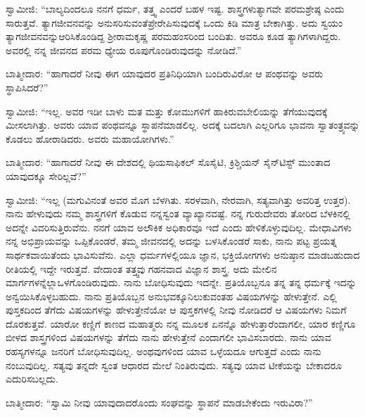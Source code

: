 \vskip 3pt

ಸ್ವಾಮೀಜಿ: “ಬಾಲ್ಯದಿಂದಲೂ ನನಗೆ ಧರ್ಮ, ತತ್ತ್ವ ಎಂದರೆ ಬಹಳ ಇಷ್ಟ. ಶಾಸ್ತ್ರಗಳು\break ತ್ಯಾಗವೇ ಪರಮಶ್ರೇಷ್ಠ ಎಂದು ಸಾರುತ್ತವೆ. ತ್ಯಾಗಜೀವನವನ್ನು ಅನುಸರಿಸುವಂತೆ\break ಪ್ರೇರೇಪಿಸುವುದಕ್ಕೆ ಒಂದು ಕಿಡಿ ಮಾತ್ರ ಬೇಕಾಗಿತ್ತು. ಅದು ಸ್ವಯಂ ತ್ಯಾಗಜೀವನವನ್ನು\break ಆರಿಸಿಕೊಂಡಿದ್ದ ಶ‍್ರೀರಾಮಕೃಷ್ಣ ಪರಮಹಂಸರಿಂದ ಬಂದಿತು. ಅವರೂ ಕೂಡ ತ್ಯಾಗಿಗಳಾಗಿದ್ದರು. ಅವರಲ್ಲಿ ನನ್ನ ಜೀವನದ ಪರಮ ಧ್ಯೇಯ ರೂಪುಗೊಂಡಿರುವುದನ್ನು ನೋಡಿದೆ.”

\vskip 3pt

ಬಾತ್ಮೀದಾರ: “ಹಾಗಾದರೆ ನೀವು ಈಗ ಯಾವುದರ ಪ್ರತಿನಿಧಿಯಾಗಿ ಬಂದಿರುವಿರೋ ಆ ಪಂಥವನ್ನು ಅವರು ಸ್ಥಾಪಿಸಿದರೆ?”

\vskip 3pt

ಸ್ವಾಮೀಜಿ: “ಇಲ್ಲ. ಅವರ ಇಡೀ ಬಾಳು ಮತ ಮತ್ತು ಕೋಮುಗಳಿಗೆ ಹಾಕಿರುವ\break ಬೇಲಿಯನ್ನು ತೆಗೆಯುವುದಕ್ಕೆ ಮೀಸಲಾಗಿತ್ತು. ಅವರು ಯಾವ ಪಂಥವನ್ನೂ ಸ್ಥಾಪನೆ\break ಮಾಡಲಿಲ್ಲ. ಅದಕ್ಕೆ ಬದಲಾಗಿ ಎಲ್ಲರಿಗೂ ಭಾವನಾ ಸ್ವಾತಂತ್ರ್ಯವನ್ನು ಕೊಡಲು ಹೋರಾಡಿದರು. ಅವರು ಮಹಾಯೋಗಿಗಳು.”

\vskip 3pt

ಬಾತ್ಮೀದಾರ: “ಹಾಗಾದರೆ ನೀವು ಈ ದೇಶದಲ್ಲಿ ಥಿಯಸಾಫಿಕಲ್​ ಸೊಸೈಟಿ, ಕ್ರಿಶ್ಚಿಯನ್​ ಸೈನ್​ಟಿಸ್ಟ್​ ಮುಂತಾದ ಯಾವುದಕ್ಕೂ ಸೇರಿಲ್ಲವೆ?”

\vskip 3pt

ಸ್ವಾಮೀಜಿ: “ಇಲ್ಲ (ಮಗುವಿನಂತೆ ಅವರ ಮೊಗ ಬೆಳಗಿತು. ಸರಳವಾಗಿ, ನೇರವಾಗಿ, ಸತ್ಯವಾಗಿತ್ತು ಅವರಿತ್ತ ಉತ್ತರ). ನಾನು ಹೇಳುವುದು ನಮ್ಮ ಶಾಸ್ತ್ರಗಳಿಗೆ ಕೊಡುವ ನನ್ನ\break ಸ್ವಂತ ವ್ಯಾಖ್ಯಾನವಷ್ಟೆ. ನನ್ನ ಗುರುದೇವರು ತೋರಿದ ಬೆಳಕಿನಲ್ಲಿ ಅದನ್ನೇ ವಿವರಿಸುತ್ತಿರುವೆನು. ನನಗೆ ಯಾವ ಅಲೌಕಿಕ ಅಧಿಕಾರವೂ ಇದೆ ಎಂದು ಹೇಳಿಕೊಳ್ಳುವುದಿಲ್ಲ. ಮೇಧಾವಿಗಳು ನನ್ನ ಅಭಿಪ್ರಾಯವನ್ನು ಒಪ್ಪಿಕೊಂಡರೆ, ತಮ್ಮ ಜೀವನದಲ್ಲಿ ಅದನ್ನು ಬಳಸಿಕೊಂಡರೆ ಸಾಕು, ನಾನು ಪಟ್ಟ ಪ್ರಯತ್ನ ಸಾರ್ಥಕವಾಯಿತೆಂದು ಭಾವಿಸುವೆನು. ಎಲ್ಲಾ ಧರ್ಮಗಳಲ್ಲಿಯೂ ಜ್ಞಾನ, ಭಕ್ತಿಯೋಗಗಳು ಅನುಷ್ಠಾನ ಮಾಡಬಹುದಾದ ರೀತಿಯಲ್ಲಿ ಇದ್ದೇ ಇರುತ್ತವೆ. ವೇದಾಂತ ತತ್ತ್ವವು ಗಹನವಾದ ವಿಜ್ಞಾನ ಶಾಸ್ತ್ರ. ಅದು ಮೇಲಿನ ಮಾರ್ಗಗಳನ್ನೆಲ್ಲಾ\break ಒಳಗೊಂಡಿರುವುದು. ನಾನು ಬೋಧಿಸುವುದು ಇದನ್ನೇ. ಪ್ರತಿಯೊಬ್ಬನೂ ತನ್ನ ತನ್ನ ಧರ್ಮಕ್ಕೆ ಇದನ್ನು ಅನ್ವಯಿಸಿಕೊಳ್ಳಬಹುದು. ನಾನು ಪ್ರತಿಯೊಬ್ಬನ ಅನುಭವಕ್ಕೂ\break ನಿಲುಕುವಂತಹ ವಿಷಯಗಳನ್ನು ಹೇಳುತ್ತೇನೆ. ಎಲ್ಲಿ ಪುಸ್ತಕದಿಂದ ತೆಗೆದು ವಿಷಯಗಳನ್ನು ಹೇಳುತ್ತೇನೆಯೋ ಆ ಪುಸ್ತಕಗಳಲ್ಲಿ ನೀವು ನೋಡಿದರೆ ಆ ವಿಷಯಗಳು ನಿಮಗೆ ದೊರಕುತ್ತವೆ. ಯಾರೋ ಕಣ್ಣಿಗೆ ಕಾಣದ ಮಹಾತ್ಮರು ನನ್ನ ಮೂಲಕ ಏನನ್ನೊ ಹೇಳುತ್ತಾರೆಂದಾಗಲೀ, ಯಾರ ಕಣ್ಣಿಗೂ ಬೀಳದ ಶಾಸ್ತ್ರಗಳಿಂದ ವಿಷಯಗಳನ್ನು ತೆಗೆದು ನಾನು ಹೇಳುತ್ತೇನೆ ಎಂದಾಗಲೀ ಭಾವಿಸಬಾರದು. ನಾನು ಯಾವ ರಹಸ್ಯಗಳನ್ನೂ ಜನರಿಗೆ ಬೋಧಿಸುವುದಿಲ್ಲ. ಅಂಥವುಗಳಿಂದ ಯಾವ ಒಳ್ಳೆಯದೂ ಆಗುತ್ತದೆ ಎಂದು ನಾನು ನಂಬುವುದಿಲ್ಲ. ಸತ್ಯವು ತನ್ನದೇ ಸ್ವಂತ ಆಧಾರದ ಮೇಲೆ ನಿಂತಿರುವುದು. ಸತ್ಯವು ಯಾವ ಟೀಕೆಯನ್ನು ಬೇಕಾದರೂ ಎದುರಿಸಬಲ್ಲದು.

\vskip 3pt

ಬಾತ್ಮೀದಾರ: “ಸ್ವಾಮಿ ನೀವು ಯಾವುದಾದರೊಂದು ಸಂಘವನ್ನು ಸ್ಥಾಪನೆ ಮಾಡಬೇಕೆಂದು ಇರುವಿರಾ?”

\vskip 3pt

